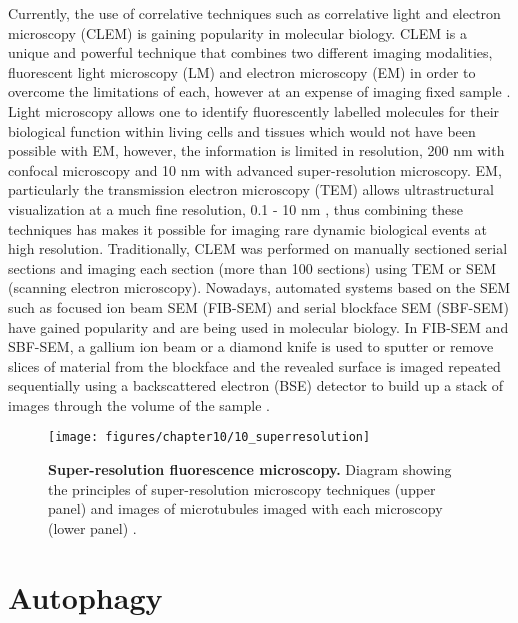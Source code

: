 Currently, the use of correlative techniques such as correlative light and electron microscopy (CLEM) is gaining popularity in molecular biology. CLEM is a unique and powerful technique that combines two different imaging modalities, fluorescent light microscopy (LM) and electron microscopy (EM) in order to overcome the limitations of each, however at an expense of imaging fixed sample \citep{Russell2017}. Light microscopy allows one to identify fluorescently labelled molecules for their biological function within living cells and tissues which would not have been possible with EM, however, the information is limited in resolution, 200 nm with confocal microscopy and 10 nm with advanced super-resolution microscopy.  EM, particularly the transmission electron microscopy (TEM) allows ultrastructural visualization at a much fine resolution, 0.1 - 10 nm \citep{Feng2018}, thus combining these techniques has makes it possible for imaging rare dynamic biological events at high resolution. Traditionally, CLEM was performed on manually sectioned serial sections and imaging each section (more than 100 sections) using TEM or SEM (scanning electron microscopy). Nowadays, automated systems  based on the SEM such as focused ion beam SEM (FIB-SEM) \citep{Heymann2006} and serial blockface SEM (SBF-SEM) \citep{Denk2004} have gained popularity and are being used in molecular biology. In FIB-SEM and SBF-SEM, a gallium ion beam  or a diamond knife is used to sputter or remove slices of material from the blockface and the revealed surface is imaged repeated sequentially using a backscattered electron (BSE) detector to build up a stack of images through the volume of the sample \citep{Russell2017}.

\begin{figure}[!htbp]
  \texttt{[image: figures/chapter10/10\_superresolution]}
  \caption[Super-resolution fluorescence microscopy.]{\textbf{Super-resolution fluorescence microscopy.} Diagram showing the principles of super-resolution microscopy techniques (upper panel) and images  of microtubules imaged with each microscopy (lower panel) \citep{Feng2018}.}
  \label{fig:10_superresolution}
\end{figure}

\section{Autophagy}
